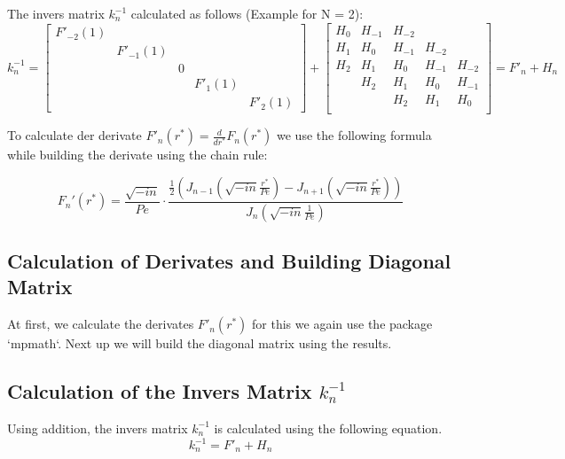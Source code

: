 \documentclass[11pt]{PyRollDocs}
\begin{document}
    The invers matrix $k_n^{-1}$ calculated as follows (Example for N = 2):
    \begin{equation}
        k_n^{-1} =
        \begin{bmatrix}
            F'_{-2}(1) &            &   &           &           \\
            & F'_{-1}(1) &   &           &           \\
            &            & 0 &           &           \\
            &            &   & F'_{1}(1) &           \\
            &            &   &           & F'_{2}(1)
        \end{bmatrix}
        +
        \begin{bmatrix}
            H_0   & H_{-1} & H_{-2} &        &        \\
            H_{1} & H_0    & H_{-1} & H_{-2} &        \\
            H_{2} & H_{1}  & H_0    & H_{-1} & H_{-2} \\
            & H_{2}  & H_{1}  & H_0    & H_{-1} \\
            &        & H_{2}  & H_{1}  & H_0    \\
        \end{bmatrix}
        = F'_n + H_n
        \label{eq:9}
    \end{equation}

    To calculate der derivate $F'_n(r^*) = \frac{d}{dr^*} F_n(r^*)$ we use the following formula while building the derivate using the chain rule:

    \begin{equation}
        F_n'(r^*) = \frac{\sqrt{-i n}}{Pe} \cdot \frac{\frac{1}{2} \left(J_{n-1} \left( \sqrt{-i n} \frac{r^*}{Pe} \right) - J_{n+1} \left( \sqrt{-i n} \frac{r^*}{Pe} \right) \right)}
        {J_n \left( \sqrt{-i n} \frac{1}{Pe} \right)}
        \label{eq:10}
    \end{equation}

    \subsection*{Calculation of Derivates and Building Diagonal Matrix}
    At first, we calculate the derivates $F'_n(r^*)$ for this we again use the package `mpmath`.
    Next up we will build the diagonal matrix using the results.

    \subsection*{Calculation of the Invers Matrix $k_n^{-1}$}
    Using addition, the invers matrix $k_n^{-1}$ is calculated using the following equation.
    \begin{equation}
        k_n^{-1} = F'_n + H_n
        \label{eq:11}
    \end{equation}
\end{document}
